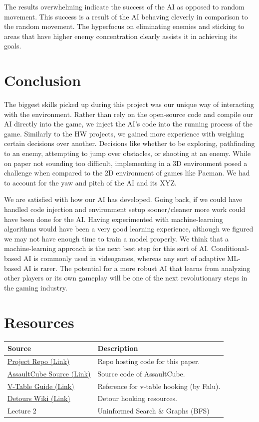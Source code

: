 \documentclass[11pt,a4paper]{article}
\begin{document}
The results overwhelming indicate the success of the AI as opposed to random movement. This success is a result of the AI behaving cleverly in comparison to the random movement. The hyperfocus on eliminating enemies and sticking to areas that have higher enemy concentration clearly assists it in achieving its goals.

\section{Conclusion}
The biggest skills picked up during this project was our unique way of interacting with the environment. Rather than rely on the open-source code and compile our AI directly into the game, we inject the AI’s code into the running process of the game. Similarly to the HW projects, we gained more experience with weighing certain decisions over another. Decisions like whether to be exploring, pathfinding to an enemy, attempting to jump over obstacles, or shooting at an enemy. While on paper not sounding too difficult, implementing in a 3D environment posed a challenge when compared to the 2D environment of games like Pacman. We had to account for the yaw and pitch of the AI and its XYZ. 

We are satisfied with how our AI has developed. Going back, if we could have handled code injection and environment setup sooner/cleaner more work could have been done for the AI. Having experimented with machine-learning algorithms would have been a very good learning experience, although we figured we may not have enough time to train a model properly. We think that a machine-learning approach is the next best step for this sort of AI. Conditional-based AI is commonly used in videogames, whereas any sort of adaptive ML-based AI is rarer. The potential for a more robust AI that learns from analyzing other players or its own gameplay will be one of the next revolutionary steps in the gaming industry. 

\enlargethispage{14\baselineskip}
\section{Resources}
\begin{table}[H]
    \begin{tabular}{|p{}|p{}|}
        \hline
        \textbf{Source} & \textbf{Description} \\ \hline
        \href{https://github.com/VX59/cse-368-team-project}{Project Repo (Link)} & Repo hosting code for this paper. \\ \hline
        \href{https://github.com/assaultcube/AC}{AssaultCube Source (Link)} & Source code of AssaultCube. \\ \hline
        \href{https://github.com/faluthe/vtable-hook}{V-Table Guide (Link)} & Reference for v-table hooking (by Falu). \\ \hline
        \href{https://github.com/microsoft/Detours/wiki}{Detours Wiki (Link)} & Detour hooking resources. \\ \hline
        Lecture 2 & Uninformed Search \& Graphs (BFS) \\ \hline
    \end{tabular}
\end{table}
\end{document}
